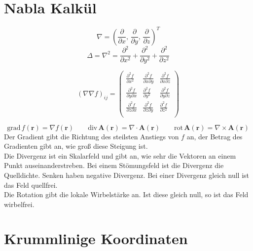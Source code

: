 \section{Nabla Kalkül}

\begin{frameddefn}
\[
\nabla = \left( \frac{\partial}{\partial x},\, \frac{\partial}{\partial y},\, \frac{\partial}{\partial z} \right)^T
\]
\[
\Delta = \nabla^2 = \frac{\partial^2}{\partial x^2} + \frac{\partial^2}{\partial y^2} + \frac{\partial^2}{\partial z^2}
\]
\end{frameddefn}

\begin{frameddefn}
\[
(\nabla\nabla f)_{ij} = 
\left(\begin{array}{rrr} 
	\frac{\partial^2 f}{\partial x^2} & \frac{\partial^2 f}{\partial x \partial y} & \frac{\partial^2 f}{\partial x \partial z} \\ 
	\frac{\partial^2 f}{\partial y \partial x} & \frac{\partial^2 f}{\partial y^2} & \frac{\partial^2 f}{\partial y \partial z} \\ 
	\frac{\partial^2 f}{\partial z \partial x} & \frac{\partial^2 f}{\partial z \partial y} & \frac{\partial^2 f}{\partial z^2} \\ 
\end{array}\right)
\]
\end{frameddefn}

\begin{frameddefn}
\[
\textrm{grad}\, f(\mathbf{r}) = \nabla f(\mathbf{r}) \qquad
\textrm{div}\, \mathbf{A}(\mathbf{r}) = \nabla \cdot \mathbf{A}(\mathbf{r}) \qquad
\textrm{rot}\, \mathbf{A}(\mathbf{r}) = \nabla \times \mathbf{A}(\mathbf{r})
\]
Der Gradient gibt die Richtung des steilsten Anstiegs von $f$ an, der Betrag des Gradienten gibt an, wie groß diese Steigung ist.\\Die Divergenz ist ein Skalarfeld und gibt an, wie sehr die Vektoren an einem Punkt auseinanderstreben. Bei einem Stömungsfeld ist die Divergenz die Quelldichte. Senken haben negative Divergenz. Bei einer Divergenz gleich null ist das Feld quellfrei.\\Die Rotation gibt die lokale Wirbelstärke an. Ist diese gleich null, so ist das Feld wirbelfrei.
\end{frameddefn}


\section{Krummlinige Koordinaten}

